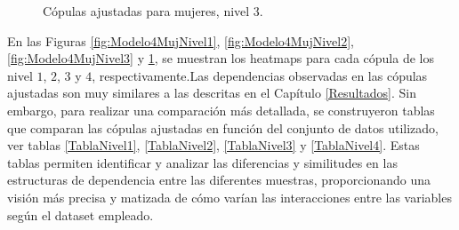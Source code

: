 \begin{figure}[H]
 \centering
    \caption{Cópulas ajustadas para mujeres, nivel $3$.}
    \label{fig:Modelo4MujNivel4}
\end{figure}


En las Figuras \ref{fig:Modelo4MujNivel1}, \ref{fig:Modelo4MujNivel2}, \ref{fig:Modelo4MujNivel3} y \ref{fig:Modelo4MujNivel4}, se muestran los heatmaps para cada cópula de los nivel $1$, $2$, $3$ y $4$, respectivamente.Las dependencias observadas en las cópulas ajustadas son muy similares a las descritas en el Capítulo \ref{Resultados}. Sin embargo, para realizar una comparación más detallada, se construyeron tablas que comparan las cópulas ajustadas en función del conjunto de datos utilizado, ver tablas \ref{TablaNivel1}, \ref{TablaNivel2}, \ref{TablaNivel3} y \ref{TablaNivel4}. Estas tablas permiten identificar y analizar las diferencias y similitudes en las estructuras de dependencia entre las diferentes muestras, proporcionando una visión más precisa y matizada de cómo varían las interacciones entre las variables según el dataset empleado.

